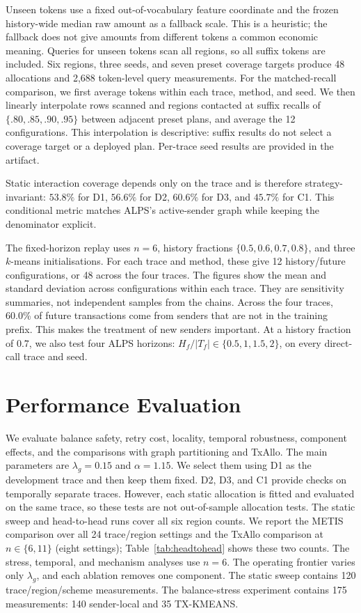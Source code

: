 \documentclass[conference,letterpaper]{IEEEtran}
\begin{document}
Unseen tokens use a fixed out-of-vocabulary feature coordinate and the frozen
history-wide median raw amount as a fallback scale. This is a heuristic; the
fallback does not give amounts from different tokens a common economic
meaning. Queries for unseen tokens scan all regions, so all suffix tokens are
included. Six regions, three seeds, and seven preset coverage targets produce
48 allocations and 2,688 token-level query measurements. For the matched-recall
comparison, we first average tokens within each trace, method, and seed. We
then linearly interpolate rows scanned and regions contacted at suffix recalls
of $\{.80,.85,.90,.95\}$ between adjacent preset plans, and average the 12
configurations. This interpolation is descriptive: suffix results do not
select a coverage target or a deployed plan. Per-trace seed results are
provided in the artifact.

Static interaction coverage depends only on the trace and is therefore
strategy-invariant: $53.8\%$ for D1, $56.6\%$ for D2, $60.6\%$ for D3, and
$45.7\%$ for C1. This conditional metric matches ALPS's active-sender graph
while keeping the denominator explicit.

The fixed-horizon replay uses $n=6$, history fractions
$\{0.5,0.6,0.7,0.8\}$, and three $k$-means initialisations. For each trace
and method, these give 12 history/future configurations, or 48 across the four
traces. The figures show the mean and standard deviation across configurations
within each trace. They are sensitivity summaries,
not independent samples from the chains. Across the four traces, 60.0\% of
future transactions come from senders that are not in the training prefix.
This makes the treatment of new senders important. At a history fraction of
$0.7$, we also test four ALPS horizons:
$H_f/|T_f|\in\{0.5,1,1.5,2\}$, on every direct-call trace and seed.

\section{Performance Evaluation}
\label{sec:results}

We evaluate balance safety, retry cost, locality, temporal robustness,
component effects, and the comparisons with graph partitioning and TxAllo.
The main parameters are $\lambda_g=0.15$ and $\alpha=1.15$. We select them
using D1 as the development trace and then keep them fixed. D2, D3, and C1
provide checks on temporally separate traces. However, each static allocation
is fitted and evaluated on the same trace, so these tests are not out-of-sample
allocation tests. The static sweep and head-to-head runs cover all six region
counts. We report the METIS comparison over all 24 trace/region settings and
the TxAllo comparison at $n\in\{6,11\}$ (eight settings); Table~\ref{tab:headtohead}
shows these two counts. The stress, temporal, and mechanism analyses use $n=6$. The operating
frontier varies only $\lambda_g$, and each ablation removes one component.
The static sweep contains 120 trace/region/scheme measurements. The
balance-stress experiment contains 175 measurements: 140 sender-local and
35 TX-KMEANS.
\end{document}
